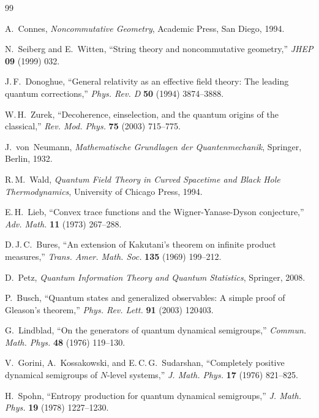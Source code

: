 \documentclass[11pt,a4paper]{article}
\theoremstyle{myrmk}
\begin{document}
\begin{thebibliography}{99}

A.~Connes, \textit{Noncommutative Geometry}, Academic Press, San Diego, 1994.

N.~Seiberg and E.~Witten,
``String theory and noncommutative geometry,''
\textit{JHEP} \textbf{09} (1999) 032.

J.\,F.~Donoghue,
``General relativity as an effective field theory: The leading quantum corrections,''
\textit{Phys. Rev. D} \textbf{50} (1994) 3874--3888.

W.\,H.~Zurek,
``Decoherence, einselection, and the quantum origins of the classical,''
\textit{Rev. Mod. Phys.} \textbf{75} (2003) 715--775.

J.~von~Neumann, \textit{Mathematische Grundlagen der Quantenmechanik},
Springer, Berlin, 1932.

R.\,M.~Wald, \textit{Quantum Field Theory in Curved Spacetime and Black Hole Thermodynamics},
University of Chicago Press, 1994.

E.\,H.~Lieb,
``Convex trace functions and the Wigner-Yanase-Dyson conjecture,''
\textit{Adv. Math.} \textbf{11} (1973) 267--288.

D.\,J.\,C.~Bures,
``An extension of Kakutani's theorem on infinite product measures,''
\textit{Trans. Amer. Math. Soc.} \textbf{135} (1969) 199--212.

D.~Petz,
\textit{Quantum Information Theory and Quantum Statistics},
Springer, 2008.

P.~Busch,
``Quantum states and generalized observables: A simple proof of Gleason's theorem,''
\textit{Phys. Rev. Lett.} \textbf{91} (2003) 120403.

G.~Lindblad,
``On the generators of quantum dynamical semigroups,''
\textit{Commun. Math. Phys.} \textbf{48} (1976) 119--130.

V.~Gorini, A.~Kossakowski, and E.\,C.\,G.~Sudarshan,
``Completely positive dynamical semigroups of $N$-level systems,''
\textit{J. Math. Phys.} \textbf{17} (1976) 821--825.

H.~Spohn,
``Entropy production for quantum dynamical semigroups,''
\textit{J. Math. Phys.} \textbf{19} (1978) 1227--1230.


\end{thebibliography}
\end{document}
